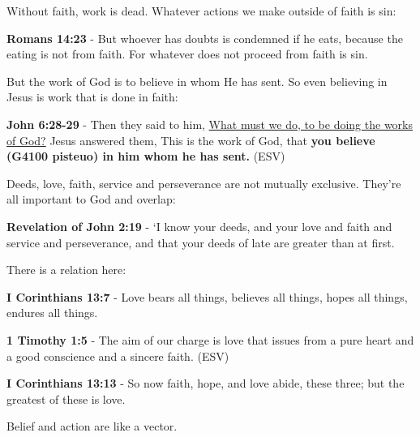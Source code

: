 \documentclass[11pt]{article}
\begin{document}
Without faith, work is dead. Whatever actions we make outside of faith is sin:

\textbf{Romans 14:23} - But whoever has doubts is condemned if he eats, because the eating is not from faith. For whatever does not proceed from faith is sin.

But the work of God is to believe in whom He has sent. So even believing in Jesus is work that is done in faith:

\textbf{John 6:28-29} - Then they said to him, \uline{What must we do, to be doing the works of God?} Jesus answered them, This is the work of God, that \textbf{you believe (G4100 pisteuo) in him whom he has sent.} (ESV)

Deeds, love, faith, service and perseverance are not mutually exclusive. They're all important to God and overlap:

\textbf{Revelation of John 2:19} - ‘I know your deeds, and your love and faith and service and perseverance, and that your deeds of late are greater than at first.

There is a relation here:

\textbf{I Corinthians 13:7} - Love bears all things, believes all things, hopes all things, endures all things.

\textbf{1 Timothy 1:5} -  The aim of our charge is love that issues from a pure heart and a good conscience and a sincere faith.  (ESV)

\textbf{I Corinthians 13:13} - So now faith, hope, and love abide, these three; but the greatest of these is love.

Belief and action are like a vector.
\end{document}
